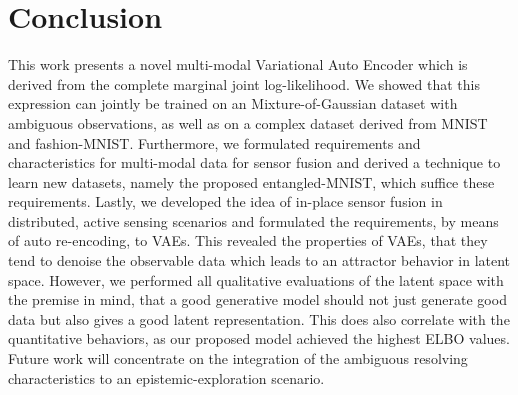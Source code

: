 \section{Conclusion}
\label{sec:conclusion}
%
This work presents a novel multi-modal Variational Auto Encoder which is derived from the complete marginal joint log-likelihood.
%
We showed that this expression can jointly be trained on an Mixture-of-Gaussian dataset with ambiguous observations, as well as on a complex dataset derived from MNIST and fashion-MNIST.
%
Furthermore, we formulated requirements and characteristics for multi-modal data for sensor fusion and derived a technique to learn new datasets, namely the proposed entangled-MNIST, which suffice these requirements.
%
Lastly, we developed the idea of in-place sensor fusion in distributed, active sensing scenarios and formulated the requirements, by means of auto re-encoding, to VAEs.
%
This revealed the properties of VAEs, that they tend to denoise the observable data which leads to an attractor behavior in latent space.
%
However, we performed all qualitative evaluations of the latent space with the premise in mind, that a good generative model should not just generate good data but also gives a good latent representation.
%
This does also correlate with the quantitative behaviors, as our proposed model achieved the highest ELBO values.
%
Future work will concentrate on the integration of the ambiguous resolving characteristics to an epistemic-exploration scenario.